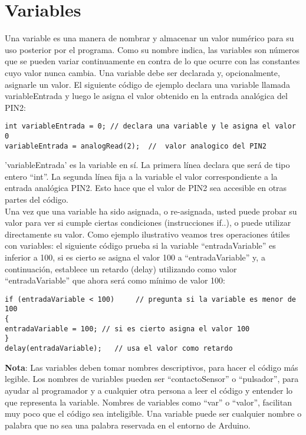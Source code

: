 \chapter{Variables}

Una variable es una manera de nombrar y almacenar un valor numérico para su uso posterior por el programa. Como su nombre indica, las variables son números que se pueden variar continuamente en contra de lo que ocurre con las constantes cuyo valor nunca cambia. Una variable debe ser declarada y, opcionalmente, asignarle un valor. El siguiente código de ejemplo declara una variable llamada variableEntrada y luego le asigna el valor obtenido en la entrada analógica del PIN2:
\begin{lstlisting}
int variableEntrada = 0; // declara una variable y le asigna el valor 0
variableEntrada = analogRead(2);  //  valor analogico del PIN2
\end{lstlisting}
'variableEntrada' es la variable en sí. La primera línea declara que será de tipo entero “int”. La segunda línea fija a la variable el valor correspondiente a la entrada analógica PIN2. Esto hace que el valor de PIN2 sea accesible en otras partes del código.\\
Una vez que una variable ha sido asignada, o re-asignada, usted puede probar su valor para ver si cumple ciertas condiciones (instrucciones if..), o puede utilizar directamente su valor. Como ejemplo ilustrativo veamos tres operaciones útiles con variables: el siguiente código prueba si la variable “entradaVariable” es inferior a 100, si es cierto se asigna el valor 100 a “entradaVariable” y, a continuación, establece un retardo (delay) utilizando como valor “entradaVariable” que ahora será como mínimo de valor 100:
\begin{lstlisting}
if (entradaVariable < 100)     // pregunta si la variable es menor de 100
{
entradaVariable = 100; // si es cierto asigna el valor 100
}
delay(entradaVariable);   // usa el valor como retardo
\end{lstlisting}
\textbf{Nota}: Las variables deben tomar nombres descriptivos, para hacer el código más legible. Los nombres de variables pueden ser “contactoSensor” o “pulsador”, para ayudar al programador y a cualquier otra persona a leer el código y entender lo que representa la variable. Nombres de variables como “var” o “valor”, facilitan muy poco que el código sea inteligible. Una variable puede ser cualquier nombre o palabra que no sea una palabra reservada en el entorno de Arduino.
